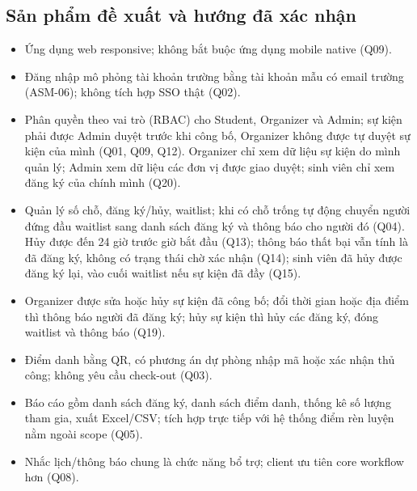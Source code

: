 \subsection*{Sản phẩm đề xuất và hướng đã xác nhận}
\begin{itemize}
  \item Ứng dụng web responsive; không bắt buộc ứng dụng mobile native (Q09).
  \item Đăng nhập mô phỏng tài khoản trường bằng tài khoản mẫu có email trường (ASM-06); không tích hợp SSO thật (Q02).
  \item Phân quyền theo vai trò (RBAC) cho Student, Organizer và Admin; sự kiện phải được Admin duyệt trước khi công bố, Organizer không được tự duyệt sự kiện của mình (Q01, Q09, Q12). Organizer chỉ xem dữ liệu sự kiện do mình quản lý; Admin xem dữ liệu các đơn vị được giao duyệt; sinh viên chỉ xem đăng ký của chính mình (Q20).
  \item Quản lý số chỗ, đăng ký/hủy, waitlist; khi có chỗ trống tự động chuyển người đứng đầu waitlist sang danh sách đăng ký và thông báo cho người đó (Q04). Hủy được đến 24 giờ trước giờ bắt đầu (Q13); thông báo thất bại vẫn tính là đã đăng ký, không có trạng thái chờ xác nhận (Q14); sinh viên đã hủy được đăng ký lại, vào cuối waitlist nếu sự kiện đã đầy (Q15).
  \item Organizer được sửa hoặc hủy sự kiện đã công bố; đổi thời gian hoặc địa điểm thì thông báo người đã đăng ký; hủy sự kiện thì hủy các đăng ký, đóng waitlist và thông báo (Q19).
  \item Điểm danh bằng QR, có phương án dự phòng nhập mã hoặc xác nhận thủ công; không yêu cầu check-out (Q03).
  \item Báo cáo gồm danh sách đăng ký, danh sách điểm danh, thống kê số lượng tham gia, xuất Excel/CSV; tích hợp trực tiếp với hệ thống điểm rèn luyện nằm ngoài scope (Q05).
  \item Nhắc lịch/thông báo chung là chức năng bổ trợ; client ưu tiên core workflow hơn (Q08).
\end{itemize}

